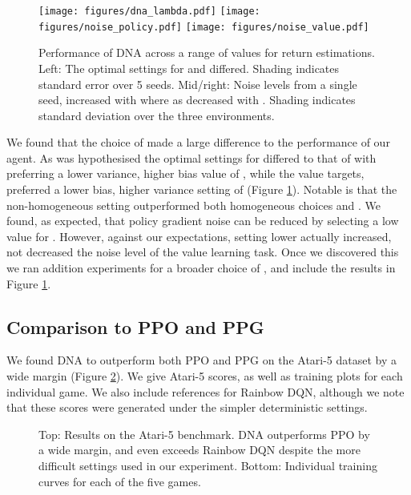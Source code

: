 \documentclass{article}
\begin{document}
\begin{figure}[!t]
    \centering
    \texttt{[image: figures/dna\_lambda.pdf]}
    \texttt{[image: figures/noise\_policy.pdf]}
    \texttt{[image: figures/noise\_value.pdf]}
    \caption{Performance of DNA across a range of  values for return estimations. Left: The optimal settings for  and  differed. Shading indicates standard error over 5 seeds. Mid/right: Noise levels from a single seed,  increased with  where as  decreased with . Shading indicates standard deviation over the three environments.}
    \label{fig:dna_lambda}
\end{figure}


We found that the choice of  made a large difference to the performance of our agent. As was hypothesised the optimal settings for  differed to that of  with  preferring a lower variance, higher bias value of , while the value targets,  preferred a lower bias, higher variance setting of  (Figure \ref{fig:dna_lambda}). Notable is that the non-homogeneous setting  outperformed both homogeneous choices  and . We found, as expected, that policy gradient noise can be reduced by selecting a low value for . However, against our expectations, setting  lower actually increased, not decreased the noise level of the value learning task. Once we discovered this we ran addition experiments for a broader choice of , and include the results in Figure \ref{fig:dna_lambda}.

\subsection{Comparison to PPO and PPG}

We found DNA to outperform both PPO and PPG on the Atari-5 dataset by a wide margin (Figure \ref{fig:final_plot}). We give Atari-5 scores, as well as training plots for each individual game. We also include references for Rainbow DQN, although we note that these scores were generated under the simpler deterministic settings.

\begin{figure}[t]
    \centering
    
    
    \caption{Top: Results on the Atari-5 benchmark. DNA outperforms PPO by a wide margin, and even exceeds Rainbow DQN despite the more difficult settings used in our experiment. Bottom: Individual training curves for each of the five games.}
    \label{fig:final_plot}
\end{figure}
\end{document}

